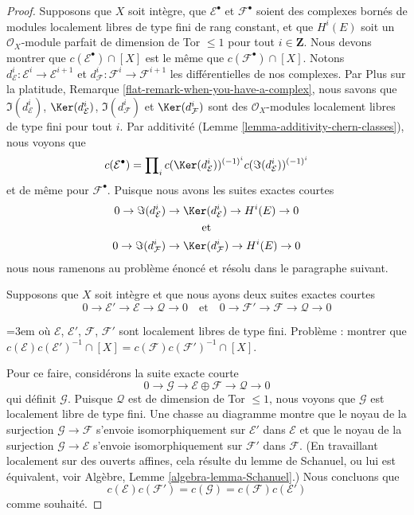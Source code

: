 \begin{proof}
\medskip\noindent
Supposons que $X$ soit intègre, que $\mathcal{E}^\bullet$ et $\mathcal{F}^\bullet$
soient des complexes bornés de modules localement libres de type fini de rang constant, et que
$H^i(E)$ soit un $\mathcal{O}_X$-module parfait de dimension de Tor $\leq 1$
pour tout $i \in \mathbf{Z}$. Nous devons
montrer que $c(\mathcal{E}^\bullet) \cap [X]$ est le même que
$c(\mathcal{F}^\bullet) \cap [X]$. Notons
$d_\mathcal{E}^i : \mathcal{E}^i \to \mathcal{E}^{i + 1}$ et
$d_\mathcal{F}^i : \mathcal{F}^i \to \mathcal{F}^{i + 1}$
les différentielles de nos complexes. Par
Plus sur la platitude, Remarque \ref{flat-remark-when-you-have-a-complex},
nous savons que $\Im(d_\mathcal{E}^i)$, $\Ker(d_\mathcal{E}^i)$,
$\Im(d_\mathcal{F}^i)$ et $\Ker(d_\mathcal{F}^i)$
sont des $\mathcal{O}_X$-modules localement libres de type fini pour tout $i$.
Par additivité (Lemme \ref{lemma-additivity-chern-classes}), nous voyons que
$$
c(\mathcal{E}^\bullet) = \prod\nolimits_i
c(\Ker(d_\mathcal{E}^i))^{(-1)^i} c(\Im(d_\mathcal{E}^i))^{(-1)^i}
$$
et de même pour $\mathcal{F}^\bullet$. Puisque nous avons les
suites exactes courtes
$$
\begin{gathered}
0 \to \Im(d_\mathcal{E}^i) \to \Ker(d_\mathcal{E}^i) \to H^i(E) \to 0
\\
\quad\text{et}\quad \\
0 \to \Im(d_\mathcal{F}^i) \to \Ker(d_\mathcal{F}^i) \to H^i(E) \to 0
\end{gathered}
$$
nous nous ramenons au problème énoncé et résolu dans le paragraphe suivant.

\medskip\noindent
Supposons que $X$ soit intègre et que nous ayons deux suites exactes courtes
$$
0 \to \mathcal{E}' \to \mathcal{E} \to \mathcal{Q} \to 0
\quad\text{et}\quad
0 \to \mathcal{F}' \to \mathcal{F} \to \mathcal{Q} \to 0
$$
{\emergencystretch=3em où $\mathcal{E}$, $\mathcal{E}'$, $\mathcal{F}$, $\mathcal{F}'$ sont
localement libres de type fini. Problème : montrer que
$c(\mathcal{E})c(\mathcal{E}')^{-1} \cap [X] =
c(\mathcal{F})c(\mathcal{F}')^{-1} \cap [X]$.\par}
Pour ce faire, considérons la suite exacte courte
$$
0 \to \mathcal{G} \to \mathcal{E} \oplus \mathcal{F} \to \mathcal{Q} \to 0
$$
qui définit $\mathcal{G}$. Puisque $\mathcal{Q}$ est de dimension de Tor $\leq 1$,
nous voyons que $\mathcal{G}$ est localement libre de type fini. Une chasse au diagramme
montre que le noyau de la surjection $\mathcal{G} \to \mathcal{F}$
s'envoie isomorphiquement sur $\mathcal{E}'$ dans $\mathcal{E}$ et
que le noyau de la surjection $\mathcal{G} \to \mathcal{E}$ s'envoie
isomorphiquement sur $\mathcal{F}'$ dans $\mathcal{F}$. (En travaillant localement
sur des ouverts affines, cela résulte du lemme de Schanuel, ou lui est équivalent, voir
Algèbre, Lemme \ref{algebra-lemma-Schanuel}.)
Nous concluons que
$$
c(\mathcal{E})c(\mathcal{F}') = c(\mathcal{G}) =
c(\mathcal{F})c(\mathcal{E}')
$$
comme souhaité.
\end{proof}

